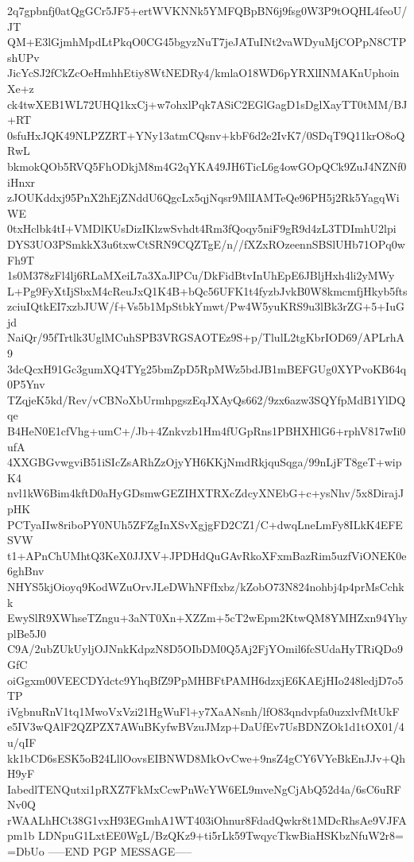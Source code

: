 2q7gpbnfj0atQgGCr5JF5+ertWVKNNk5YMFQBpBN6j9fsg0W3P9tOQHL4feoU/JT
QM+E3lGjmhMpdLtPkqO0CG45bgyzNuT7jeJATuINt2vaWDyuMjCOPpN8CTPshUPv
JicYcSJ2fCkZcOeHmhhEtiy8WtNEDRy4/kmlaO18WD6pYRXlINMAKnUphoinXe+z
ck4twXEB1WL72UHQ1kxCj+w7ohxlPqk7ASiC2EGlGagD1sDglXayTT0tMM/BJ+RT
0sfuHxJQK49NLPZZRT+YNy13atmCQsnv+kbF6d2e2IvK7/0SDqT9Q11krO8oQRwL
bkmokQOb5RVQ5FhODkjM8m4G2qYKA49JH6TicL6g4owGOpQCk9ZuJ4NZNf0iHnxr
zJOUKddxj95PnX2hEjZNddU6QgcLx5qjNqsr9MlIAMTeQe96PH5j2Rk5YagqWiWE
0txHclbk4tI+VMDlKUsDizIKlzwSvhdt4Rm3fQoqy5niF9gR9d4zL3TDImhU2lpi
DYS3UO3PSmkkX3u6txwCtSRN9CQZTgE/n//fXZxROzeennSBSlUHb71OPq0wFh9T
1s0M378zFl4lj6RLaMXeiL7a3XaJlPCu/DkFidBtvInUhEpE6JBljHxh4li2yMWy
L+Pg9FyXtIjSbxM4cReuJxQ1K4B+bQc56UFK1t4fyzbJvkB0W8kmcmfjHkyb5fts
zciuIQtkEI7xzbJUW/f+Vs5b1MpStbkYmwt/Pw4W5yuKRS9u3lBk3rZG+5+IuGjd
NaiQr/95fTrtlk3UglMCuhSPB3VRGSAOTEz9S+p/TlulL2tgKbrIOD69/APLrhA9
3dcQcxH91Gc3gumXQ4TYg25bmZpD5RpMWz5bdJB1mBEFGUg0XYPvoKB64q0P5Ynv
TZqjeK5kd/Rev/vCBNoXbUrmhpgszEqJXAyQs662/9zx6azw3SQYfpMdB1YlDQqe
B4HeN0E1cfVhg+umC+/Jb+4Znkvzb1Hm4fUGpRns1PBHXHlG6+rphV817wIi0ufA
4XXGBGvwgviB51iSIcZsARhZzOjyYH6KKjNmdRkjquSqga/99nLjFT8geT+wipK4
nvl1kW6Bim4kftD0aHyGDsmwGEZIHXTRXcZdcyXNEbG+c+ysNhv/5x8DirajJpHK
PCTyaIIw8riboPY0NUh5ZFZgInXSvXgjgFD2CZ1/C+dwqLneLmFy8ILkK4EFESVW
t1+APnChUMhtQ3KeX0JJXV+JPDHdQuGAvRkoXFxmBazRim5uzfViONEK0e6ghBnv
NHYS5kjOioyq9KodWZuOrvJLeDWhNFfIxbz/kZobO73N824nohbj4p4prMsCchkk
EwySlR9XWhseTZngu+3aNT0Xn+XZZm+5cT2wEpm2KtwQM8YMHZxn94YhyplBe5J0
C9A/2ubZUkUyljOJNnkKdpzN8D5OIbDM0Q5Aj2FjYOmil6fcSUdaHyTRiQDo9GfC
oiGgxm00VEECDYdctc9YhqBfZ9PpMHBFtPAMH6dzxjE6KAEjHIo248ledjD7o5TP
iVgbnuRnV1tq1MwoVxVzi21HgWuFl+y7XaANsnh/lfO83qndvpfa0uzxlvfMtUkF
e5IV3wQAlF2QZPZX7AWuBKyfwBVzuJMzp+DaUfEv7UsBDNZOk1d1tOX01/4u/qIF
kk1bCD6sESK5oB24LllOovsEIBNWD8MkOvCwe+9nsZ4gCY6VYeBkEnJJv+QhH9yF
IabedlTENQutxi1pRXZ7FkMxCcwPnWcYW6EL9mveNgCjAbQ52d4a/6sC6uRFNv0Q
rWAALhHCt38G1vxH93EGmhA1WT403iOhnur8FdadQwkr8t1MDcRhsAe9VJFApm1b
LDNpuG1LxtEE0WgL/BzQKz9+ti5rLk59TwqycTkwBiaHSKbzNfuW2r8=
=DbUo
-----END PGP MESSAGE-----
